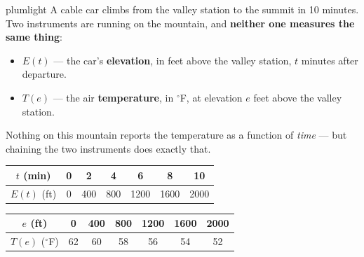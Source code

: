 \documentclass[10pt]{article}
\begin{document}

\vspace{0.12in}

\begin{scenariobox}{plumlight}
\small
A cable car climbs from the valley station to the summit in 10 minutes. Two
instruments are running on the mountain, and \textbf{neither one measures the
same thing}:

\begin{itemize}[itemsep=2pt, topsep=2pt]
  \item $E(t)$ --- the car's \textbf{elevation}, in feet above the valley
        station, $t$ minutes after departure.
  \item $T(e)$ --- the air \textbf{temperature}, in $^\circ$F, at elevation $e$
        feet above the valley station.
\end{itemize}

Nothing on this mountain reports the temperature as a function of \textit{time}
--- but chaining the two instruments does exactly that.

\begin{center}
\end{center}

\renewcommand{\arraystretch}{1.3}
\begin{center}
\begin{tabular}{|c|c|c|c|c|c|c|}
\hline
$t$ (min) & 0 & 2 & 4 & 6 & 8 & 10 \\
\hline
$E(t)$ (ft) & 0 & 400 & 800 & 1200 & 1600 & 2000 \\
\hline
\end{tabular}

\smallskip
\begin{tabular}{|c|c|c|c|c|c|c|}
\hline
$e$ (ft) & 0 & 400 & 800 & 1200 & 1600 & 2000 \\
\hline
$T(e)$ ($^\circ$F) & 62 & 60 & 58 & 56 & 54 & 52 \\
\hline
\end{tabular}
\end{center}
\end{scenariobox}
\end{document}
